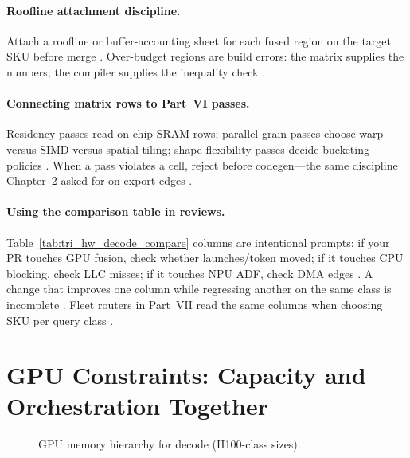 \paragraph{Roofline attachment discipline.}
Attach a roofline or buffer-accounting sheet for each fused region on the target SKU before merge \citep{memoryfloor2026,yirage2026}.
Over-budget regions are build errors: the matrix supplies the numbers; the compiler supplies the inequality check \citep{nvidia2022hopper,chen2020compilerbasedhardw}.

\paragraph{Connecting matrix rows to Part~VI passes.}
Residency passes read on-chip SRAM rows; parallel-grain passes choose warp versus SIMD versus spatial tiling; shape-flexibility passes decide bucketing policies \citep{yirage2026,lai2023relax,chen2020compilerbasedhardw}.
When a pass violates a cell, reject before codegen---the same discipline Chapter~2 asked for on export edges \citep{chen2020compilerbasedhardw,taxbreak2026}.

\paragraph{Using the comparison table in reviews.}
Table~\ref{tab:tri_hw_decode_compare} columns are intentional prompts: if your PR touches GPU fusion, check whether launches/token moved; if it touches CPU blocking, check LLC misses; if it touches NPU ADF, check DMA edges \citep{taxbreak2026,amd2024xdna,dlbook}.
A change that improves one column while regressing another on the same class is incomplete \citep{memoryfloor2026,yirage2026}.
Fleet routers in Part~VII read the same columns when choosing SKU per query class \citep{patel2025llminference}.

\section{GPU Constraints: Capacity and Orchestration Together}
\label{sec:gpu_constraints}

\begin{figure}[t]
\centering
{}
\caption{GPU memory hierarchy for decode (H100-class sizes).}
\label{fig:gpu_memory_hierarchy}
\end{figure}

